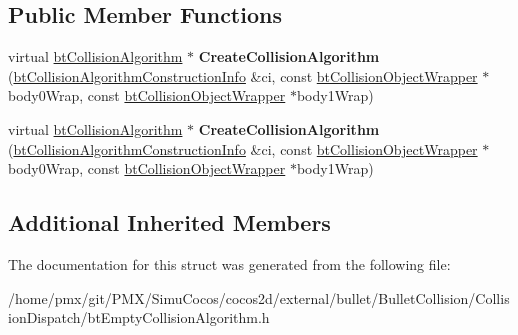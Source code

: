 \subsection*{Public Member Functions}
\begin{DoxyCompactItemize}
\item 
\mbox{\label{structCreateFunc_ac51b1ed6b911ba951d9f608886e60c92}} 
virtual \hyperlink{classbtCollisionAlgorithm}{bt\+Collision\+Algorithm} $\ast$ {\bfseries Create\+Collision\+Algorithm} (\hyperlink{structbtCollisionAlgorithmConstructionInfo}{bt\+Collision\+Algorithm\+Construction\+Info} \&ci, const \hyperlink{structbtCollisionObjectWrapper}{bt\+Collision\+Object\+Wrapper} $\ast$body0\+Wrap, const \hyperlink{structbtCollisionObjectWrapper}{bt\+Collision\+Object\+Wrapper} $\ast$body1\+Wrap)
\item 
\mbox{\label{structCreateFunc_ac51b1ed6b911ba951d9f608886e60c92}} 
virtual \hyperlink{classbtCollisionAlgorithm}{bt\+Collision\+Algorithm} $\ast$ {\bfseries Create\+Collision\+Algorithm} (\hyperlink{structbtCollisionAlgorithmConstructionInfo}{bt\+Collision\+Algorithm\+Construction\+Info} \&ci, const \hyperlink{structbtCollisionObjectWrapper}{bt\+Collision\+Object\+Wrapper} $\ast$body0\+Wrap, const \hyperlink{structbtCollisionObjectWrapper}{bt\+Collision\+Object\+Wrapper} $\ast$body1\+Wrap)
\end{DoxyCompactItemize}
\subsection*{Additional Inherited Members}


The documentation for this struct was generated from the following file\+:\begin{DoxyCompactItemize}
\item 
/home/pmx/git/\+P\+M\+X/\+Simu\+Cocos/cocos2d/external/bullet/\+Bullet\+Collision/\+Collision\+Dispatch/bt\+Empty\+Collision\+Algorithm.\+h\end{DoxyCompactItemize}
